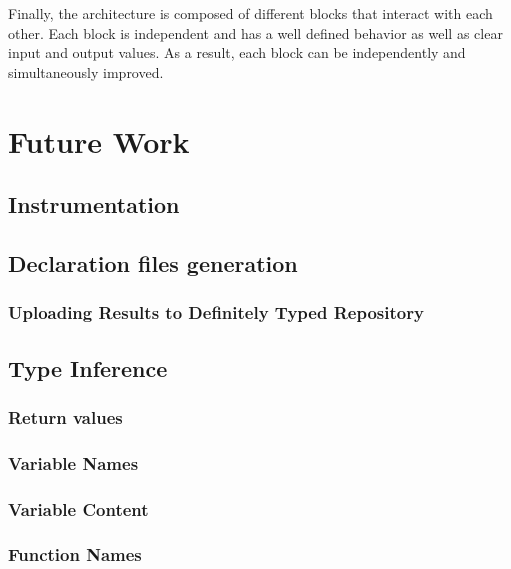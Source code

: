 Finally, the architecture is composed of different blocks that interact with each other. Each block is independent and has a well defined behavior as well as clear input and output values. As a result, each block can be independently and simultaneously improved.

\section{Future Work} \label{sec:conclusions-future-work}

\subsection{Instrumentation}

\subsection{Declaration files generation}
\subsubsection{Uploading Results to Definitely Typed Repository}


\subsection{Type Inference}


\subsubsection{Return values}

\subsubsection{Variable Names}

\subsubsection{Variable Content}

\subsubsection{Function Names}

